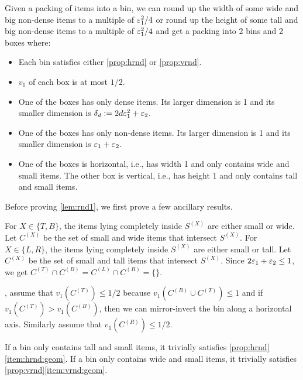 \begin{lemma}
\label{lem:rnd1}
Given a packing of items into a bin, we can
round up the width of some wide and big non-dense items to a multiple of $\varepsilon_1^2/4$
or round up the height of some tall and big non-dense items to a multiple of $\varepsilon_1^2/4$
and get a packing into 2 bins and 2 boxes where:
\begin{itemize}
\item Each bin satisfies either \cref{prop:hrnd} or \cref{prop:vrnd}.
\item $v_1$ of each box is at most $1/2$.
\item One of the boxes has only dense items.
Its larger dimension is 1 and its smaller dimension is
$\delta_d := 2d\varepsilon_1^2 + \varepsilon_2$.
\item One of the boxes has only non-dense items.
Its larger dimension is 1 and its smaller dimension is $\varepsilon_1 + \varepsilon_2$.
\item One of the boxes is horizontal, i.e., has width 1 and only contains wide and small items.
The other box is vertical, i.e., has height 1 and only contains tall and small items.
\end{itemize}
\end{lemma}

Before proving \cref{lem:rnd1}, we first prove a few ancillary results.

For $X \in \{T, B\}$, the items lying completely inside $S^{(X)}$ are either small or wide.
Let $C^{(X)}$ be the set of small and wide items that intersect $S^{(X)}$.
For $X \in \{L, R\}$, the items lying completely inside $S^{(X)}$ are either small or tall.
Let $C^{(X)}$ be the set of small and tall items that intersect $S^{(X)}$.
Since $2\varepsilon_1 + \varepsilon_2 \le 1$, we get
$C^{(T)} \cap C^{(B)} = C^{(L)} \cap C^{(R)} = \{\}$.

\WLoG, assume that $v_1(C^{(T)}) \le 1/2$ because $v_1(C^{(B)} \cup C^{(T)}) \le 1$
and if $v_1(C^{(T)}) > v_1(C^{(B)})$, then we can mirror-invert the bin along a horizontal axis.
Similarly assume that $v_1(C^{(R)}) \le 1/2$.

\begin{comment}
Some small items may belong to both $C^{(T)}$ and $C^{(R)}$.
We will end up double-counting them in our analysis.
That's not an issue, since we can always remove these duplicate items.
\end{comment}

\begin{observation}
If a bin only contains tall and small items,
it trivially satisfies \cref{prop:hrnd}\ref{item:hrnd:geom}.
If a bin only contains wide and small items,
it trivially satisfies \cref{prop:vrnd}\ref{item:vrnd:geom}.
\end{observation}

